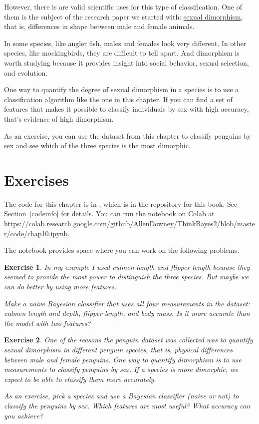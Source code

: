 \documentclass[12pt]{book}
\theoremstyle{exercise}
\newtheorem{exercise}{Exercise}[chapter]
\begin{document}
However, there is are valid scientific uses for this type of
classification. One of them is the subject of the research paper we
started with:
\href{https://en.wikipedia.org/wiki/Sexual_dimorphism}{sexual
dimorphism}, that is, differences in shape between male and female
animals.

In some species, like angler fish, males and females look very
different. In other species, like mockingbirds, they are difficult to
tell apart. And dimorphism is worth studying because it provides insight
into social behavior, sexual selection, and evolution.

One way to quantify the degree of sexual dimorphism in a species is to
use a classification algorithm like the one in this chapter. If you can
find a set of features that makes it possible to classify individuals by
sex with high accuracy, that's evidence of high dimorphism.

As an exercise, you can use the dataset from this chapter to classify
penguins by sex and see which of the three species is the most
dimorphic.

\section{Exercises}

The code for this chapter is in , which is in the repository for this book.  See Section~\ref{codeinfo} for details.
You can run the notebook on Colab at \url{https://colab.research.google.com/github/AllenDowney/ThinkBayes2/blob/master/code/chap10.ipynb}.

The notebook provides space where you can work on the following problems.

\begin{exercise} In my example I used culmen length and flipper length
because they seemed to provide the most power to distinguish the three
species. But maybe we can do better by using more features.

Make a naive Bayesian classifier that uses all four measurements in the
dataset: culmen length and depth, flipper length, and body mass. Is it
more accurate than the model with two features?

\end{exercise} 


\begin{exercise} 

One of the reasons the penguin dataset was collected
was to quantify sexual dimorphism in different penguin species, that is,
physical differences between male and female penguins. One way to
quantify dimorphism is to use measurements to classify penguins by sex.
If a species is more dimorphic, we expect to be able to classify them
more accurately.

As an exercise, pick a species and use a Bayesian classifier (naive or
not) to classify the penguins by sex. Which features are most useful?
What accuracy can you achieve?
\end{exercise} 
\end{document}
